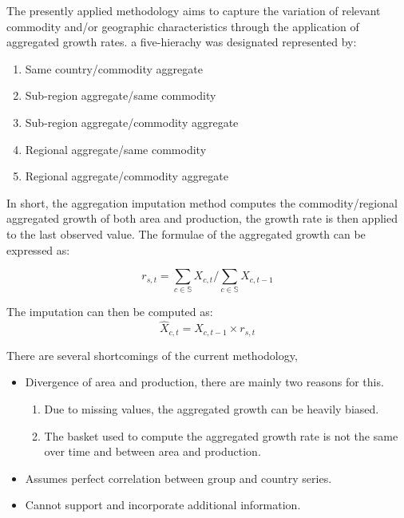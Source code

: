 \documentclass{beamer}
\begin{document}
\begin{frame}

  The presently applied methodology aims to capture the variation of relevant
  commodity and/or geographic characteristics through the application
  of aggregated growth rates. a five-hierachy was designated represented 
  by:

  \begin{enumerate}
    \item Same country/commodity aggregate
    \item Sub-region aggregate/same commodity
    \item Sub-region aggregate/commodity aggregate
    \item Regional aggregate/same commodity
    \item Regional aggregate/commodity aggregate
  \end{enumerate}

\end{frame}

\begin{frame}

  In short, the aggregation imputation method computes the
  commodity/regional aggregated growth of both area and production,
  the growth rate is then applied to the last observed value. The
  formulae of the aggregated growth can be expressed as:
  
  \begin{equation}
    \label{eq:aggregateGrowth}
    r_{s, t} = \sum_{c \in \mathbb{S}} X_{c, t}/\sum_{c \in \mathbb{S}} X_{c, t-1}
  \end{equation}
  
  The imputation can then be computed as:
  \begin{equation}
    \hat{X}_{c, t} = X_{c, t-1} \times r_{s, t}
  \end{equation}
  
\end{frame}

\begin{frame}
  There are several shortcomings of the current methodology,
  \begin{itemize}
  \item Divergence of area and production, there are mainly two reasons for this.
    \begin{enumerate}
      \item Due to missing values, the aggregated growth can be heavily biased.
      \item The basket used to compute the aggregated growth rate is
        not the same over time and between area and production.
    \end{enumerate}
  \item Assumes perfect correlation between group and country series.
  \item Cannot support and incorporate additional information.
  \end{itemize}
\end{frame}
\end{document}
